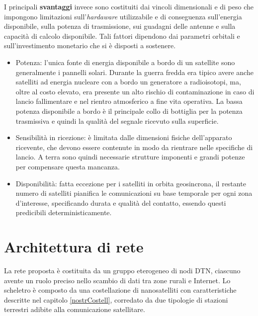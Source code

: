 \documentclass[12pt,a4paper,oneside]{book}
\begin{document}
			I principali {\bf svantaggi} invece sono costituiti dai vincoli dimensionali e di peso che impongono limitazioni sull'\textit{hardaware} utilizzabile e di conseguenza sull'energia disponibile, sulla potenza di trasmissione, sui guadagni delle antenne e sulla capacità di calcolo disponibile. Tali fattori dipendono dai parametri orbitali e sull'investimento monetario che si è disposti a sostenere. 
			\begin{itemize}
				\item Potenza: l'unica fonte di energia disponibile a bordo di un satellite sono generalmente i pannelli solari. Durante la guerra fredda era tipico avere anche satelliti ad energia nucleare con a bordo un generatore a radioisotopi, ma, oltre al costo elevato, era presente un alto rischio di contaminazione in caso di lancio fallimentare e nel rientro atmosferico a fine vita operativa.
				La bassa potenza disponibile a bordo è il principale collo di bottiglia per la potenza trasmissiva e quindi la qualità del segnale ricevuto sulla superficie. 
				\item Sensibilità in ricezione: è limitata dalle dimensioni fisiche dell'apparato ricevente, che devono essere contenute in modo da rientrare nelle specifiche di lancio. A terra sono quindi necessarie strutture imponenti e grandi potenze per compensare questa mancanza. 
				\item Disponibilità: fatta eccezione per i satelliti in orbita geosincrona, il restante numero di satelliti pianifica le comunicazioni su base temporale per ogni zona d'interesse, specificando durata e qualità del contatto, essendo questi predicibili deterministicamente.			
			\end{itemize}
			
			
		
		\section{Architettura di rete}	\label{archRete}
		
		La rete proposta è costituita da un gruppo eterogeneo di nodi DTN, ciascuno avente un ruolo preciso nello scambio di dati tra zone rurali e Internet. Lo scheletro è composto da una costellazione di nanosatelliti con caratteristiche descritte nel capitolo \ref{nostrCostell}, corredato da due tipologie di stazioni terrestri adibite alla comunicazione satellitare. 
		
\end{document}

